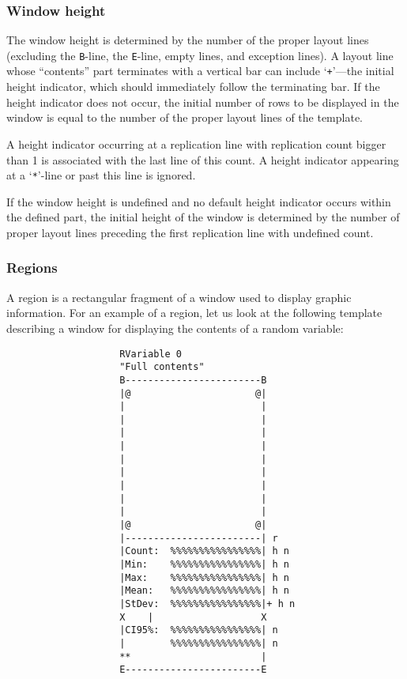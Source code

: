 \subsubsection{Window height}
\label{rm_ds_tp_wh}

The window height is determined by the number of the proper layout lines
(excluding the {\tt B}-line, the {\tt E}-line, empty lines, and exception
lines).
A layout line whose ``contents'' part terminates with a vertical bar can
include `{\tt +}'---the initial height indicator,
which should immediately follow the terminating bar.
If the height indicator
does not occur, the initial number of rows to be displayed in the window
is equal to the number of the proper layout lines of the template.

A height indicator occurring at a replication line with replication count
bigger than 1 is associated with the last line of this count.
A height indicator appearing at a `{\tt **}'-line or past this line is ignored.

If the window height is undefined
and no default height indicator occurs within the defined part,
the initial height of the window is determined by the number of proper
layout lines preceding the first replication line with undefined count.

\subsubsection{Regions}
\label{rm_ds_tp_re}

A region is a rectangular fragment of a window used to display graphic
information.
For an example of a region, let us look at the following template describing
a window for displaying the contents of a random variable:

{\small
\begin{verbatim}
                    RVariable 0
                    "Full contents"
                    B------------------------B
                    |@                      @|
                    |                        |
                    |                        |
                    |                        |
                    |                        |
                    |                        |
                    |                        |
                    |                        |
                    |                        |
                    |                        |
                    |@                      @|
                    |------------------------| r
                    |Count:  %%%%%%%%%%%%%%%%| h n
                    |Min:    %%%%%%%%%%%%%%%%| h n
                    |Max:    %%%%%%%%%%%%%%%%| h n
                    |Mean:   %%%%%%%%%%%%%%%%| h n
                    |StDev:  %%%%%%%%%%%%%%%%|+ h n
                    X    |                   X
                    |CI95%:  %%%%%%%%%%%%%%%%| n
                    |        %%%%%%%%%%%%%%%%| n
                    **                       |
                    E------------------------E
\end{verbatim}}

